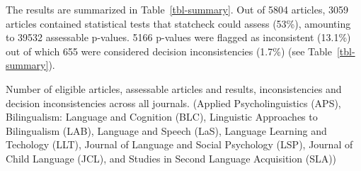 \documentclass[
  doc,
  longtable,
  nolmodern,
  notxfonts,
  notimes,
  colorlinks=true,linkcolor=blue,citecolor=blue,urlcolor=blue]{apa7}
\begin{document}
The results are summarized in Table~\ref{tbl-summary}. Out of 5804
articles, 3059 articles contained statistical tests that statcheck could
assess (53\%), amounting to 39532 assessable p-values. 5166 p-values
were flagged as inconsistent (13.1\%) out of which 655 were considered
decision inconsistencies (1.7\%) (see Table~\ref{tbl-summary}).

\begin{table}

{\caption{{Number of eligible articles, assessable articles and results,
inconsistencies and decision inconsistencies across all journals.
(Applied Psycholinguistics (APS), Bilingualism: Language and Cognition
(BLC), Linguistic Approaches to Bilingualism (LAB), Language and Speech
(LaS), Language Learning and Techology (LLT), Journal of Language and
Social Psychology (LSP), Journal of Child Language (JCL), and Studies in
Second Language Acquisition (SLA))}{\label{tbl-summary}}}}


\end{table}
\end{document}
